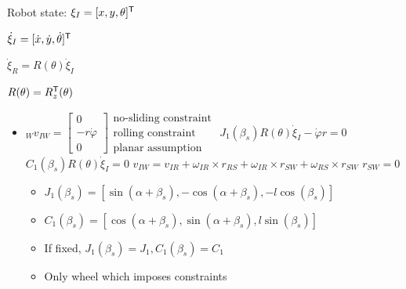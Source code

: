 \begin{itemize*}
    \item Robot state: $\xi_I = [x, y, \theta]^{\mathsf{T}}$
    \item $\dot \xi_I = [\dot x, \dot y, \dot \theta]^{\mathsf{T}}$
    \item $\dot \xi_R = R(\theta) \dot \xi_I$
    \item $R(\theta) = R^{\mathsf{T}}_z(\theta)$
\end{itemize*}
\begin{itemize}
    \item ${}_W v_{IW} =
        \begin{bmatrix}
            0\\
            -r \dot \varphi\\
            0
        \end{bmatrix}
        \begin{matrix}
            \text{no-sliding constraint}\\
            \text{rolling constraint}\\
            \text{planar assumption}
        \end{matrix}$
     $J_1(\beta_s) R(\theta) \dot \xi_I - \dot \varphi r = 0$
     $C_1(\beta_s) R(\theta) \dot \xi_I = 0$
     $v_{IW} = v_{IR} + \omega_{IR} \times r_{RS} + \omega_{IR} \times r_{SW} + \omega_{RS} \times r_{SW}$
     $r_{SW} = 0$
        \begin{itemize}
             $v_{IW} = v_{IR} + \omega_{IR} \times r_{RS}$
                \begin{itemize}
                    \item ${}_W v_{IR} = R(\alpha + \beta) R(\theta)[\dot x, \dot y, 0]^\transpose$
                    \item ${}_W \omega_{IR} \times {}_W r_{RS} = [l \dot \theta \sin(\beta), l \dot \theta \cos(\beta), 0]^\transpose$
                \end{itemize}
            \item $J_1(\beta_s) = [\sin(\alpha + \beta_s), -\cos(\alpha + \beta_s), -l \cos(\beta_s)]$
            \item $C_1(\beta_s) = [\cos(\alpha + \beta_s), \sin(\alpha + \beta_s), l \sin(\beta_s)]$
            \item If fixed, $J_1(\beta_s) = J_1, C_1(\beta_s) = C_1$
            \item Only wheel which imposes constraints

\end{itemize}
\end{itemize}
